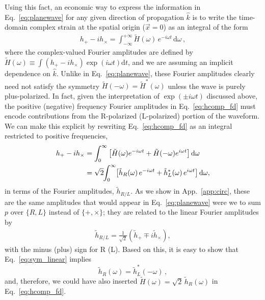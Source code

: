 \documentclass[aps,prd,twocolumn,superscriptaddress,preprintnumbers,floatfix,nofootinbib]{revtex4-2}
\newcommand{\beq}{\begin{equation}}
\newcommand{\eeq}{\end{equation}}
\newcommand{\infd}{\mathrm{d}}
\begin{document}
Using this fact, an economic way to express the information in Eq.~\eqref{eq:planewave} for any given direction of propagation $\hat{k}$ is to write the time-domain complex strain at the spatial origin ($\vec{x}=0$) as an integral of the form
\begin{align} \label{eq:hcomp_fd}
h_+ - i h_\times = \int_{-\infty}^{+\infty} \tilde{H}(\omega)\, e^{-i \omega t} \,\infd \omega \, ,
\end{align}
where the complex-valued Fourier amplitudes are defined by $\tilde{H}(\omega) \equiv \int (h_+ - i h_\times) \exp(i\omega t) \infd t$, and we are assuming an implicit dependence on $\hat{k}$.
Unlike in Eq.~\eqref{eq:planewave}, these Fourier amplitudes clearly need not satisfy the symmetry $\tilde{H}(-\omega) = \tilde{H}^*(\omega)$ unless the wave is purely plus-polarized.
In fact, given the interpretation of $\exp(\pm i \omega t)$ discussed above, the positive (negative) frequency Fourier amplitudes in Eq.~\eqref{eq:hcomp_fd} must encode contributions from the R-polarized (L-polarized) portion of the waveform.
We can make this explicit by rewriting Eq.~\eqref{eq:hcomp_fd} as an integral restricted to positive frequencies,
\begin{align} \label{eq:hcomp_fd_rl}
h_+ - i h_\times &=\int_{0}^{\infty} \left[ \tilde{H}(\omega)e^{-i\omega t}
+ \tilde{H}(-\omega)e^{i\omega t} \right]\infd \omega \nonumber\\
&= \sqrt{2} \hspace{-2.5pt} \int_{0}^{\infty} \hspace{-2.5pt} \left[ \tilde{h}_R(\omega)\, e^{-i \omega t} + \tilde{h}_L^*(\omega)\, e^{i \omega t}\right] \infd \omega ,
\end{align}
in terms of the Fourier amplitudes, $\tilde{h}_{R/L}$.
As we show in App.~\ref{app:circ}, these are the same amplitudes that would appear in Eq.~\eqref{eq:planewave} were we to sum $p$ over $\{R, L\}$ instead of $\{+,\times\}$; they are related to the linear Fourier amplitudes by
\begin{align}
\tilde{h}_{R/L} = \frac{1}{\sqrt{2}} \left(\tilde{h}_+ \mp i\tilde{h}_\times \right) ,
\end{align}
with the minus (plus) sign for R (L).
Based on this, it is easy to show that Eq.~\eqref{eq:sym_linear} implies
\beq \label{eq:sym_circular}
\tilde{h}_R(\omega) = \tilde{h}_L^*(-\omega) \,,
\eeq
and, therefore, we could have also inserted $\tilde{H}(\omega) = \sqrt{2}\, \tilde{h}_R(\omega)$ in Eq.~\eqref{eq:hcomp_fd}.
\end{document}

